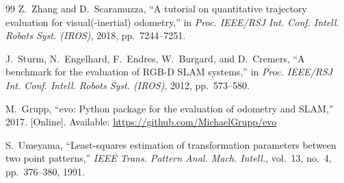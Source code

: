 \documentclass[conference,a4paper]{IEEEtran}
\begin{document}
\begin{thebibliography}{99}
Z.~Zhang and D.~Scaramuzza,
``A tutorial on quantitative trajectory evaluation for visual(-inertial) odometry,''
in \emph{Proc. IEEE/RSJ Int. Conf. Intell. Robots Syst. (IROS)}, 2018, pp.~7244--7251.

J.~Sturm, N.~Engelhard, F.~Endres, W.~Burgard, and D.~Cremers,
``A benchmark for the evaluation of RGB-D SLAM systems,''
in \emph{Proc. IEEE/RSJ Int. Conf. Intell. Robots Syst. (IROS)}, 2012, pp.~573--580.

M.~Grupp, ``evo: Python package for the evaluation of odometry and SLAM,'' 2017. [Online].
Available: \url{https://github.com/MichaelGrupp/evo}

S.~Umeyama, ``Least-squares estimation of transformation parameters between two point
patterns,'' \emph{IEEE Trans. Pattern Anal. Mach. Intell.}, vol.~13, no.~4, pp.~376--380, 1991.

\end{thebibliography}
\end{document}
